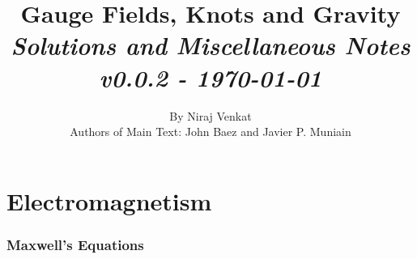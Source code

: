 \documentclass[10pt]{article}
\begin{document}
\nocite{*}

\title{{Gauge Fields, Knots and Gravity}\\{\normalsize{\itshape Solutions and Miscellaneous Notes}}\\{\normalsize{\itshape v0.0.2 - \today}}}
\author{By Niraj Venkat\\Authors of Main Text: John Baez and Javier P. Muniain}
\maketitle
\newpage
\pagestyle{fancynotes}


\part{Electromagnetism}


\section{Maxwell's Equations}\label{b1c1}
\end{document}
